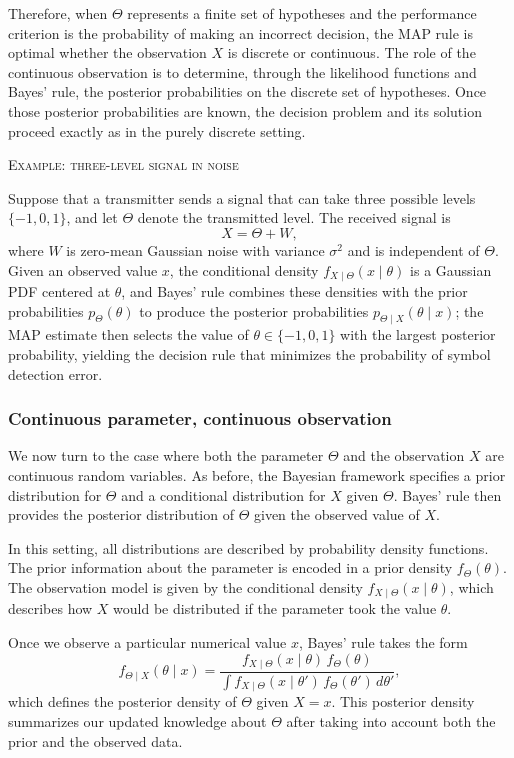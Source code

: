 Therefore, when \(\Theta\) represents a finite set of hypotheses and the performance criterion is the probability of making an incorrect decision, the MAP rule is optimal whether the observation \(X\) is discrete or continuous.  
The role of the continuous observation is to determine, through the likelihood functions and Bayes' rule, the posterior probabilities on the discrete set of hypotheses.  
Once those posterior probabilities are known, the decision problem and its solution proceed exactly as in the purely discrete setting.

\bigskip
\textsc{Example: three-level signal in noise}

Suppose that a transmitter sends a signal that can take three possible levels \(\{-1,0,1\}\), and let \(\Theta\) denote the transmitted level.  
The received signal is
\[
X = \Theta + W,
\]
where \(W\) is zero-mean Gaussian noise with variance \(\sigma^{2}\) and is independent of \(\Theta\).  
Given an observed value \(x\), the conditional density \(f_{X \mid \Theta}(x \mid \theta)\) is a Gaussian PDF centered at \(\theta\), and Bayes' rule combines these densities with the prior probabilities \(p_{\Theta}(\theta)\) to produce the posterior probabilities \(p_{\Theta \mid X}(\theta \mid x)\); the MAP estimate then selects the value of \(\theta \in \{-1,0,1\}\) with the largest posterior probability, yielding the decision rule that minimizes the probability of symbol detection error.


\subsubsection{Continuous parameter, continuous observation}

We now turn to the case where both the parameter \(\Theta\) and the observation \(X\) are continuous random variables.  
As before, the Bayesian framework specifies a prior distribution for \(\Theta\) and a conditional distribution for \(X\) given \(\Theta\).  
Bayes' rule then provides the posterior distribution of \(\Theta\) given the observed value of \(X\).  

In this setting, all distributions are described by probability density functions.  
The prior information about the parameter is encoded in a prior density \(f_{\Theta}(\theta)\).  
The observation model is given by the conditional density \(f_{X \mid \Theta}(x \mid \theta)\), which describes how \(X\) would be distributed if the parameter took the value \(\theta\).  

Once we observe a particular numerical value \(x\), Bayes' rule takes the form
\[
f_{\Theta \mid X}(\theta \mid x)
=
\frac{f_{X \mid \Theta}(x \mid \theta)\,f_{\Theta}(\theta)}
{\int f_{X \mid \Theta}(x \mid \theta')\,f_{\Theta}(\theta')\,d\theta'},
\]
which defines the posterior density of \(\Theta\) given \(X = x\).  
This posterior density summarizes our updated knowledge about \(\Theta\) after taking into account both the prior and the observed data.  

